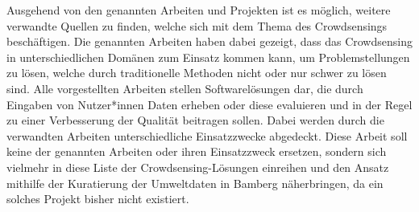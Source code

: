 Ausgehend von den genannten Arbeiten und Projekten ist es möglich, weitere verwandte Quellen zu finden, welche sich mit dem Thema des Crowdsensings beschäftigen. Die genannten Arbeiten haben dabei gezeigt, dass das Crowdsensing in unterschiedlichen Domänen zum Einsatz kommen kann, um Problemstellungen zu lösen, welche durch traditionelle Methoden nicht oder nur schwer zu lösen sind. Alle vorgestellten Arbeiten stellen Softwarelösungen dar, die durch Eingaben von Nutzer*innen Daten erheben oder diese evaluieren und in der Regel zu einer Verbesserung der Qualität beitragen sollen. Dabei werden durch die verwandten Arbeiten unterschiedliche Einsatzzwecke abgedeckt. Diese Arbeit soll keine der genannten Arbeiten oder ihren Einsatzzweck ersetzen, sondern sich vielmehr in diese Liste der Crowdsensing-Lösungen einreihen und den Ansatz mithilfe der Kuratierung der Umweltdaten in Bamberg näherbringen, da ein solches Projekt bisher nicht existiert.